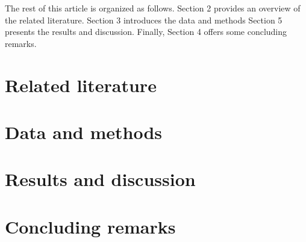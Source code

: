 \documentclass[11pt,usenames,dvipsnames]{article}
\begin{document}









The rest of this article is organized as follows. 
Section 2 provides an overview of the related literature.
Section 3 introduces the data and methods
Section 5 presents the results and discussion.
Finally, Section 4 offers some concluding remarks.


\section{Related literature}


\section{Data and methods}




\section{Results and discussion}





\section{Concluding remarks}




{\small


}
\end{document}
